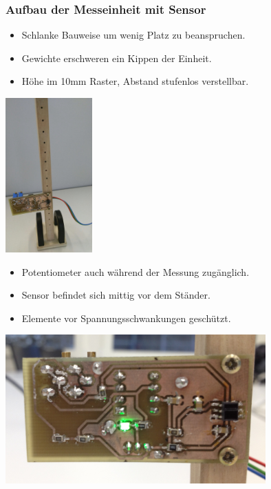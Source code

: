 \begin{frame}
	\frametitle{Aufbau der Messeinheit mit Sensor}
	\begin{minipage}{0.45\textwidth}
		\begin{itemize}
			\item Schlanke Bauweise um wenig Platz zu beanspruchen.
			\item Gewichte erschweren ein Kippen der Einheit.
			\item Höhe im 10mm Raster, Abstand stufenlos verstellbar.
		\end{itemize}
		\centering
		\includegraphics[width=0.25\textwidth]{../docs/images/Sensor_FullView}
	\end{minipage}
	\begin{minipage}{0.45\textwidth}
		\begin{itemize}
			\item Potentiometer auch während der Messung zugänglich.
			\item Sensor befindet sich mittig vor dem Ständer.
			\item Elemente vor Spannungsschwankungen geschützt.
		\end{itemize}
		\centering
		\includegraphics[width=0.75\textwidth]{../docs/images/Sensor_Detail}
	\end{minipage}
\end{frame}

